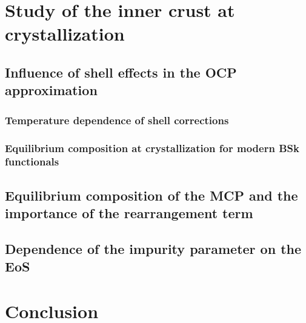 \section{Study of the inner crust at crystallization}

\subsection{Influence of shell effects in the OCP
approximation}\label{subsec:shtemp}

\subsubsection{Temperature dependence of shell corrections}

\subsubsection{Equilibrium composition at crystallization for modern BSk 
functionals}

\subsection{Equilibrium composition of the MCP and the importance of the
rearrangement term}

\subsection{Dependence of the impurity parameter on the EoS}

\section{Conclusion}

